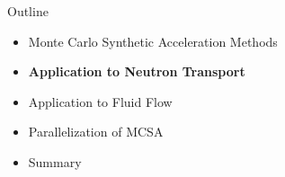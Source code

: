 \documentclass{beamer}
\begin{document}
\begin{frame}{Outline}

  \begin{itemize}
  \item Monte Carlo Synthetic Acceleration Methods
    \bigskip
  \item \textbf{Application to Neutron Transport}
    \bigskip
  \item Application to Fluid Flow
    \bigskip
  \item Parallelization of MCSA
    \bigskip
  \item Summary
  \end{itemize}

\end{frame}
\end{document}
